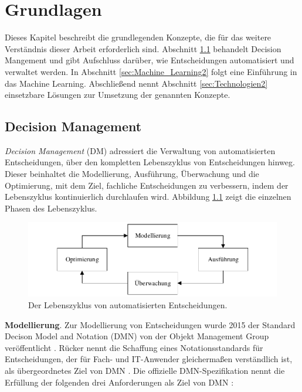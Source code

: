 \chapter{Grundlagen}
\label{ch:Grundlagen2}

Dieses Kapitel beschreibt die grundlegenden Konzepte, die für das weitere Verständnis dieser Arbeit erforderlich sind. Abschnitt \ref{sec:Decision_Management2} behandelt Decision Mangement und gibt Aufschluss darüber, wie Entscheidungen automatisiert und verwaltet werden. In Abschnitt  \ref{sec:Machine_Learning2} folgt eine Einführung in das Machine Learning. Abschließend nennt Abschnitt \ref{sec:Technologien2} einsetzbare Lösungen zur Umsetzung der genannten Konzepte. 

\section{Decision Management}
\label{sec:Decision_Management2}

\emph{Decision Management} (DM) adressiert die Verwaltung von automatisierten Entscheidungen, über den kompletten Lebenszyklus von Entscheidungen hinweg. Dieser beinhaltet die Modellierung, Ausführung, Überwachung und die Optimierung, mit dem Ziel, fachliche Entscheidungen zu verbessern, indem der Lebenszyklus kontinuierlich durchlaufen wird. Abbildung \ref{fig:lifecycle} zeigt die einzelnen Phasen des Lebenszyklus.

\begin{figure}[ht]
\centering
\includegraphics{images/lifecycle.pdf}
\caption{Der Lebenszyklus von automatisierten Entscheidungen.}
\label{fig:lifecycle}
\end{figure}

\textbf{Modellierung}. Zur Modellierung von Entscheidungen wurde 2015 der Standard Decison Model and Notation (DMN) von der Objekt Management Group veröffentlicht \cite[vgl. S. 7 ff.]{OM16}. Rücker nennt die Schaffung eines Notationsstandards für Entscheidungen, der für Fach- und IT-Anwender gleichermaßen verständlich ist, als übergeordnetes Ziel von DMN \cite[vgl. S. 40]{BR16}.  Die offizielle DMN-Spezifikation nennt die Erfüllung der folgenden drei Anforderungen als Ziel von DMN \cite[vgl. S. 18 ff.]{OM16}: 

